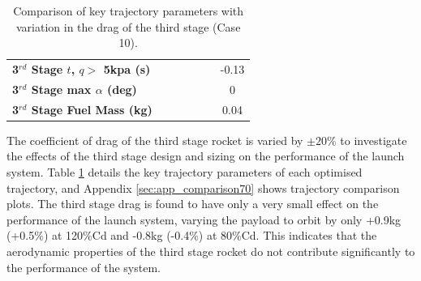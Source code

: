 \begin{table}[ht]
\begin{tabular}{l c c c c c c}
		\textbf{3$^{rd}$ Stage $t$, $q >$ 5kpa (s)}
		& \thirdqOverFiveCdThreeEightyNoReturn
		& \thirdqOverFiveCdThreeNinetyNoReturn
		& \thirdqOverFiveCdThreeStandardNoReturn
		& \thirdqOverFiveCdThreeOneHundredTenNoReturn
		& \thirdqOverFiveCdThreeOneHundredTwentyNoReturn
		&-0.13
		\\
		\textbf{3$^{rd}$ Stage max $\alpha$ (deg)}
		& \thirdmaxAoACdThreeEightyNoReturn
		& \thirdmaxAoACdThreeNinetyNoReturn
		& \thirdmaxAoACdThreeStandardNoReturn
		& \thirdmaxAoACdThreeOneHundredTenNoReturn
		& \thirdmaxAoACdThreeOneHundredTwentyNoReturn
		&0
		\\
		\textbf{3$^{rd}$ Stage Fuel Mass (kg)}
		& \thirdmFuelCdThreeEightyNoReturn
		& \thirdmFuelCdThreeNinetyNoReturn
		& \thirdmFuelCdThreeStandardNoReturn
		& \thirdmFuelCdThreeOneHundredTenNoReturn
		& \thirdmFuelCdThreeOneHundredTwentyNoReturn
		&0.04
		\\
		\hline 
	\end{tabular} 
	\caption{Comparison of key trajectory parameters with variation in the drag of the third stage (Case 10).}
	\label{tab:comparison70}
	
\end{table}

The coefficient of drag of the third stage rocket is varied by $\pm20\%$ to investigate the effects of the third stage design and sizing on the performance of the launch system. Table \ref{tab:comparison70} details the key trajectory parameters of each optimised trajectory, and Appendix \ref{sec:app_comparison70} shows trajectory comparison plots. The third stage drag is found to have only a very small effect on the performance of the launch system, varying the payload to orbit by only +0.9kg (+0.5\%) at 120\%Cd and -0.8kg (-0.4\%) at 80\%Cd. This indicates that the aerodynamic properties of the third stage rocket do not contribute significantly to the performance of the system. 

